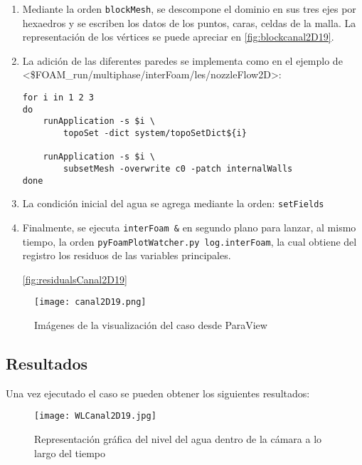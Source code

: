 \begin{enumerate}
\def\labelenumi{\arabic{enumi}.}
\item
  Mediante la orden \texttt{blockMesh}, se descompone el dominio en sus
  tres ejes por hexaedros y se escriben los datos de los puntos, caras,
  celdas de la malla. La representación de los vértices se puede apreciar en \autoref{fig:blockcanal2D19}.



\item
  La adición de las diferentes paredes se implementa como en el ejemplo
  de
  \textless{}\$FOAM\_run/multiphase/interFoam/les/nozzleFlow2D\textgreater{}:

\begin{verbatim}
for i in 1 2 3
do
    runApplication -s $i \
        topoSet -dict system/topoSetDict${i}

    runApplication -s $i \
        subsetMesh -overwrite c0 -patch internalWalls
done
\end{verbatim}
\item
  La condición inicial del agua se agrega mediante la orden:
  \texttt{setFields}
\item
  Finalmente, se ejecuta \texttt{interFoam\ \&} en segundo plano para
  lanzar, al mismo tiempo, la orden
  \texttt{pyFoamPlotWatcher.py\ log.interFoam}, la cual obtiene del
  registro los residuos de las variables principales.

  \autoref{fig:residualsCanal2D19}

\end{enumerate}

\begin{figure}
\centering
\texttt{[image: canal2D19.png]}
\caption{Imágenes de la visualización del caso desde ParaView}
\label{fig:canal2D19}
\end{figure}

\subsection{Resultados}\label{header-n173}

Una vez ejecutado el caso se pueden obtener los siguientes resultados:

\begin{figure}
\centering
\texttt{[image: WLCanal2D19.jpg]}
\caption[Representación gráfica del nivel del agua]{Representación gráfica del nivel del agua dentro de la cámara a lo largo del tiempo}
\label{fig:WLCanal2D19}
\end{figure}

